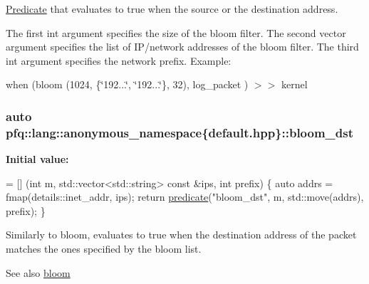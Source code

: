 \hyperlink{structpfq_1_1lang_1_1Predicate}{Predicate} that evaluates to {\ttfamily true} when the source or the destination address. 

The first {\ttfamily int} argument specifies the size of the bloom filter. The second {\ttfamily vector} argument specifies the list of I\+P/network addresses of the bloom filter. The third {\ttfamily int} argument specifies the network prefix. Example\+:

when (bloom (1024, \{\char`\"{}192...\char`\"{}, \char`\"{}192...\char`\"{}\}, 32), log\+\_\+packet ) $>$$>$ kernel 
\subsubsection[{\texorpdfstring{bloom\+\_\+dst}{bloom_dst}}]{\setlength{\rightskip}{0pt plus 5cm}auto pfq\+::lang\+::anonymous\+\_\+namespace\{default.\+hpp\}\+::bloom\+\_\+dst}\hypertarget{namespacepfq_1_1lang_1_1anonymous__namespace_02default_8hpp_03_ac1c667000a13acfbda8490d5748b91c4}{}\label{namespacepfq_1_1lang_1_1anonymous__namespace_02default_8hpp_03_ac1c667000a13acfbda8490d5748b91c4}
{\bfseries Initial value\+:}
\begin{DoxyCode}
= [] (\textcolor{keywordtype}{int} m, std::vector<std::string> \textcolor{keyword}{const} &ips, \textcolor{keywordtype}{int} prefix) \{
                                \textcolor{keyword}{auto} addrs = fmap(details::inet\_addr, ips);
                                \textcolor{keywordflow}{return} \hyperlink{namespacepfq_1_1lang_aca9adafc436b7f851621b979fa1aaf88}{predicate}(\textcolor{stringliteral}{"bloom\_dst"}, m, std::move(addrs), prefix);
                          \}
\end{DoxyCode}
Similarly to {\ttfamily bloom}, evaluates to {\ttfamily true} when the destination address of the packet matches the ones specified by the bloom list. \begin{DoxySeeAlso}{See also}
\hyperlink{namespacepfq_1_1lang_1_1anonymous__namespace_02default_8hpp_03_abfcd230137acb93cfd99f7a0a7c1f17f}{bloom} 
\end{DoxySeeAlso}
